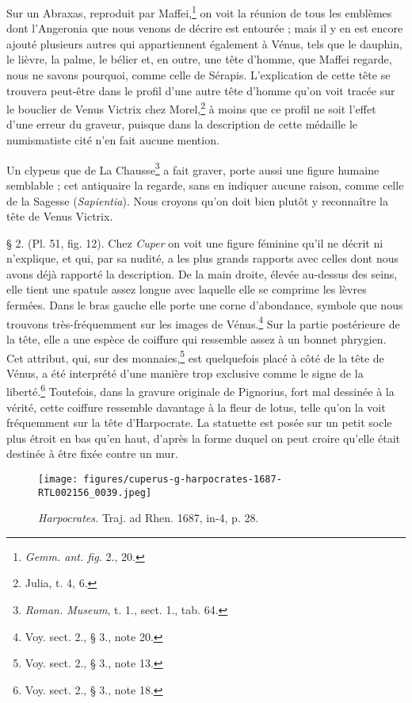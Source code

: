 \documentclass[a4paper, 11pt, oneside, polutonikogreek, french]{article}
\begin{document}
Sur un Abraxas, reproduit par Maffei,\footnote{\emph{Gemm. ant. fig.} 2., 20.} on voit la réunion de tous les emblèmes dont l'Angeronia que nous venons de décrire est entourée ; mais il y en est encore ajouté plusieurs autres qui appartiennent également à Vénus, tels que le dauphin, le lièvre, la palme, le bélier et, en outre, une tête d'homme, que Maffei regarde, nous ne savons pourquoi, comme celle de Sérapis. L'explication de cette tête se trouvera peut-être dans le profil d'une autre tête d'homme qu'on voit tracée sur le bouclier de Venus Victrix chez Morel,\footnote{Julia, t. 4, 6.} à moins que ce profil ne soit l'effet d'une erreur du graveur, puisque dans la description de cette médaille le numismatiste cité n'en fait aucune mention.

Un clypeus que de La Chausse\footnote{\emph{Roman. Museum}, t. 1., sect. 1., tab. 64.} a fait graver, porte aussi une figure humaine semblable ; cet antiquaire la regarde, sans en indiquer aucune raison, comme celle de la Sagesse (\emph{Sapientia}). Nous croyons qu'on doit bien plutôt y reconnaître la tête de Venus Victrix.

§ 2. (Pl. 51, fig. 12). Chez \emph{Cuper} on voit une figure féminine qu'il ne décrit ni n'explique, et qui, par sa nudité, a les plus grands rapports avec celles dont nous avons déjà rapporté la description. De la main droite, élevée au-dessus des seins, elle tient une spatule assez longue avec laquelle elle se comprime les lèvres fermées. Dans le bras gauche elle porte une corne d'abondance, symbole que nous trouvons très-fréquemment sur les images de Vénus.\footnote{Voy. sect. 2., § 3., note 20.} Sur la partie postérieure de la tête, elle a une espèce de coiffure qui ressemble assez à un bonnet phrygien. Cet attribut, qui, sur des monnaies,\footnote{Voy. sect. 2., § 3., note 13.} est quelquefois placé à côté de la tête de Vénus, a été interprété d'une manière trop exclusive comme le signe de la liberté.\footnote{Voy. sect. 2., § 3., note 18.} Toutefois, dans la gravure originale de Pignorius, fort mal dessinée à la vérité, cette coiffure ressemble davantage à la fleur de lotus, telle qu'on la voit fréquemment sur la tête d'Harpocrate. La statuette est posée sur un petit socle plus étroit en bas qu'en haut, d'après la forme duquel on peut croire qu'elle était destinée à être fixée contre un mur.

\begin{figure}[H]
\centering
\texttt{[image: figures/cuperus-g-harpocrates-1687-RTL002156\_0039.jpeg]}
\caption{\emph{Harpocrates.} Traj. ad Rhen. 1687, in-4, p. 28.}
\end{figure}
\end{document}
